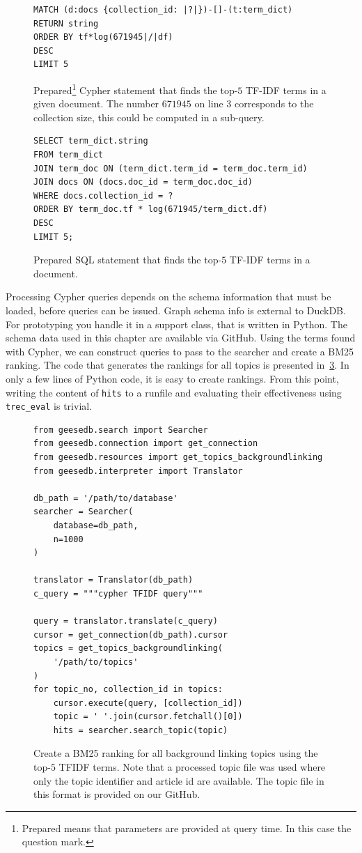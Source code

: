 \begin{figure}
	\begin{verbatim}
MATCH (d:docs {collection_id: |?|})-[]-(t:term_dict)
RETURN string
ORDER BY tf*log(671945|/|df)
DESC
LIMIT 5
	\end{verbatim}
	\caption{Prepared\footnote{Prepared means that parameters are provided at query time. In this case the question mark.} Cypher statement that finds the top-$5$ TF-IDF terms in a given document. The number $671945$ on line 3 corresponds to the collection size, this could be computed in a sub-query.}
	\label{fig:tfidf-cypher}
\end{figure}
\begin{figure}
	\begin{verbatim}
SELECT term_dict.string
FROM term_dict
JOIN term_doc ON (term_dict.term_id = term_doc.term_id)
JOIN docs ON (docs.doc_id = term_doc.doc_id)
WHERE docs.collection_id = ?
ORDER BY term_doc.tf * log(671945/term_dict.df)
DESC
LIMIT 5;
	\end{verbatim}
	\caption{Prepared SQL statement that finds the top-$5$ TF-IDF terms in a document.}
	\label{fig:tfidf}
\end{figure}
Processing Cypher queries depends on the schema information that must be loaded, before queries can be issued. Graph schema info is external to DuckDB. For prototyping you handle it in a support class, that is written in Python. The schema data used in this chapter are available via GitHub. Using the terms found with Cypher, we can construct queries to pass to the searcher and create a BM25 ranking. The code that generates the rankings for all topics is presented in~\cref{fig:code_bm25_background_linking}. In only a few lines of Python code, it is easy to create rankings. From this point, writing the content of \texttt{hits} to a runfile and evaluating their effectiveness using \texttt{trec\_eval} is trivial. 

\begin{figure}
	\begin{verbatim}
from geesedb.search import Searcher
from geesedb.connection import get_connection
from geesedb.resources import get_topics_backgroundlinking
from geesedb.interpreter import Translator

db_path = '/path/to/database'
searcher = Searcher(
    database=db_path, 
    n=1000
)

translator = Translator(db_path)
c_query = """cypher TFIDF query"""

query = translator.translate(c_query)
cursor = get_connection(db_path).cursor
topics = get_topics_backgroundlinking(
    '/path/to/topics'
)
for topic_no, collection_id in topics:
    cursor.execute(query, [collection_id])
    topic = ' '.join(cursor.fetchall()[0])
    hits = searcher.search_topic(topic)
	\end{verbatim}
	\caption{Create a BM25 ranking for all background linking topics using the top-$5$ TFIDF terms. Note that a processed topic file was used where only the topic identifier and article id are available. The topic file in this format is provided on our GitHub.}
	\label{fig:code_bm25_background_linking}
\end{figure}

